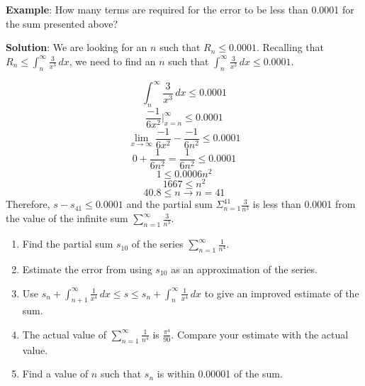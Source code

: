 \textbf{Example}: How many terms are required for the error to be less than 
0.0001 for the sum presented above?

\textbf{Solution}: We are looking for an $n$ such that $R_n \leq 0.0001$. 
Recalling that $R_n \leq \int_{n}^\infty \frac{3}{x^3}\,dx$, we need to find 
an $n$ such that $\int_{n}^\infty \frac{3}{x^3}\,dx \leq 0.0001$. 

$$\int_n^\infty \frac{3}{x^3}\,dx \leq 0.0001$$
$$\frac{-1}{6x^2}|_{x=n}^\infty \leq 0.0001$$
$$\lim_{x \to \infty} \frac{-1}{6x^2} - \frac{-1}{6n^2} \leq 0.0001$$
$$0 + \frac{1}{6n^2} = \frac{1}{6n^2} \leq 0.0001$$
$$1 \leq 0.0006n^2$$
$$1667 \leq n^2$$
$$40.8 \leq n \rightarrow n = 41$$
Therefore, $s - s_{41} \leq 0.0001$ and the partial sum $\Sigma_{n=1}^{41} 
\frac{3}{n^3}$ is less than 0.0001 from the value of the infinite sum $\sum_
{n=1}^\infty \frac{3}{n^3}$.

\begin{Exercise}[label=remainder1]
\begin{enumerate}
\item Find the partial sum $s_{10}$ of the series $\sum_{n=1}^\infty 
\frac{1}{n^4}$. 
\item Estimate the error from using $s_{10}$ as an approximation of the series.
\item Use $s_n + \int_{n+1}^\infty \frac{1}{x^4}\,dx \leq s \leq s_n + \int_n^
\infty \frac{1}{x^4}\,dx$ to give an improved estimate of the sum.
\item The actual value of $\sum_{n=1}^\infty \frac{1}{n^4}$ is 
$\frac{\pi^4}{90}$. Compare your estimate with the actual value.
\item Find a value of $n$ such that $s_n$ is within 0.00001 of the sum. 
\end{enumerate}
\vspace{50mm}
\end{Exercise}

